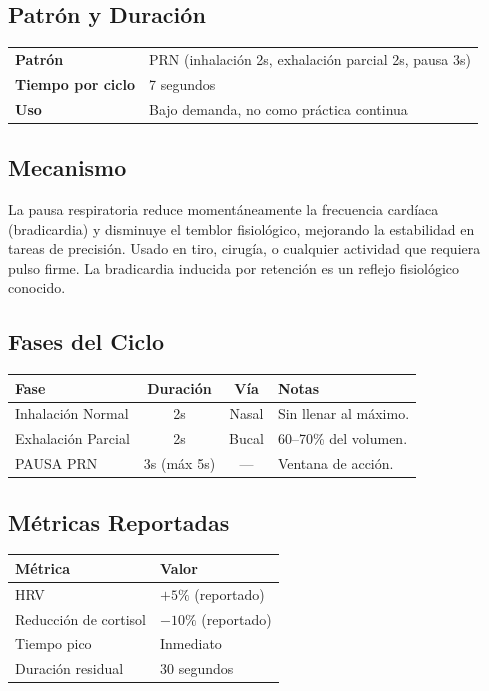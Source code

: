 \documentclass[12pt,a4paper]{article}
\begin{document}
\subsection*{Patrón y Duración}
\begin{tabularx}{\textwidth}{lX}
    \textbf{Patrón} & PRN (inhalación 2s, exhalación parcial 2s, pausa 3s) \\
    \textbf{Tiempo por ciclo} & 7 segundos \\
    \textbf{Uso} & Bajo demanda, no como práctica continua \\
\end{tabularx}

\subsection*{Mecanismo}
La pausa respiratoria reduce momentáneamente la frecuencia cardíaca (bradicardia)
y disminuye el temblor fisiológico, mejorando la estabilidad en tareas de
precisión. Usado en tiro, cirugía, o cualquier actividad que requiera pulso
firme. La bradicardia inducida por retención es un reflejo fisiológico conocido.

\subsection*{Fases del Ciclo}
\begin{tabularx}{\textwidth}{lccX}
    \toprule
    \textbf{Fase} & \textbf{Duración} & \textbf{Vía} & \textbf{Notas} \\
    \midrule
    Inhalación Normal & 2s & Nasal & Sin llenar al máximo. \\
    Exhalación Parcial & 2s & Bucal & 60--70\% del volumen. \\
    PAUSA PRN & 3s (máx 5s) & — & Ventana de acción. \\
    \bottomrule
\end{tabularx}

\subsection*{Métricas Reportadas}
\begin{tabularx}{\textwidth}{lX}
    \toprule
    \textbf{Métrica} & \textbf{Valor} \\
    \midrule
    HRV & $+5\%$ (reportado) \\
    Reducción de cortisol & $-10\%$ (reportado) \\
    Tiempo pico & Inmediato \\
    Duración residual & 30 segundos \\
    \bottomrule
\end{tabularx}
\end{document}
